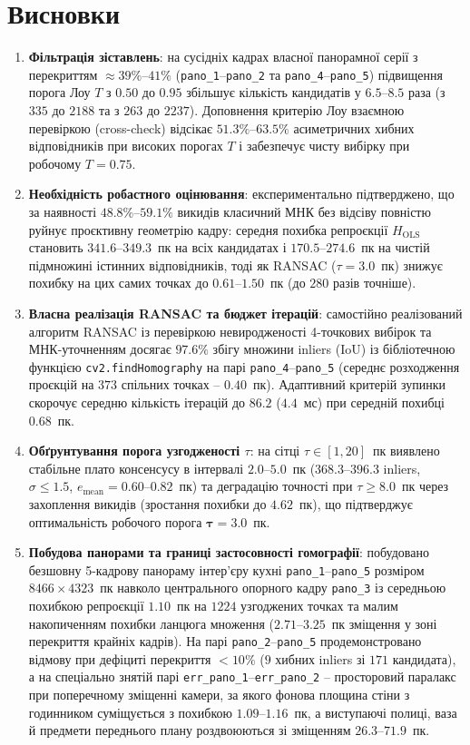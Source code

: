 \documentclass[14pt, a4paper]{extarticle}
\begin{document}
\section{Висновки}
\begin{enumerate}
    \item \textbf{Фільтрація зіставлень}: на сусідніх кадрах власної панорамної серії з перекриттям $\approx 39\%$--$41\%$ (\texttt{pano\_1}--\texttt{pano\_2} та \texttt{pano\_4}--\texttt{pano\_5}) підвищення порога Лоу $T$ з $0.50$ до $0.95$ збільшує кількість кандидатів у $6.5$--$8.5$ раза (з $335$ до $2188$ та з $263$ до $2237$). Доповнення критерію Лоу взаємною перевіркою (cross-check) відсікає $51.3\%$--$63.5\%$ асиметричних хибних відповідників при високих порогах $T$ і забезпечує чисту вибірку при робочому $T=0.75$.
    \item \textbf{Необхідність робастного оцінювання}: експериментально підтверджено, що за наявності $48.8\%$--$59.1\%$ викидів класичний МНК без відсіву повністю руйнує проєктивну геометрію кадру: середня похибка репроєкції $H_{\text{OLS}}$ становить $341.6$--$349.3$~пк на всіх кандидатах і $170.5$--$274.6$~пк на чистій підмножині істинних відповідників, тоді як RANSAC ($\tau=3.0$~пк) знижує похибку на цих самих точках до $\mathbf{0.61}$--$\mathbf{1.50}$~пк (до $280$ разів точніше).
    \item \textbf{Власна реалізація RANSAC та бюджет ітерацій}: самостійно реалізований алгоритм RANSAC із перевіркою невиродженості 4-точкових вибірок та МНК-уточненням досягає $\mathbf{97.6\%}$ збігу множини inliers (IoU) із бібліотечною функцією \texttt{cv2.findHomography} на парі \texttt{pano\_4}--\texttt{pano\_5} (середнє розходження проєкцій на $373$ спільних точках -- $0.40$~пк). Адаптивний критерій зупинки скорочує середню кількість ітерацій до $86.2$ ($4.4$~мс) при середній похибці $0.68$~пк.
    \item \textbf{Обґрунтування порога узгодженості $\tau$}: на сітці $\tau \in [1, 20]$~пк виявлено стабільне плато консенсусу в інтервалі $2.0$--$5.0$~пк ($368.3$--$396.3$ inliers, $\sigma \le 1.5$, $e_{\text{mean}} = 0.60$--$0.82$~пк) та деградацію точності при $\tau \ge 8.0$~пк через захоплення викидів (зростання похибки до $4.62$~пк), що підтверджує оптимальність робочого порога $\mathbf{\tau = 3.0}$~пк.
    \item \textbf{Побудова панорами та границі застосовності гомографії}: побудовано безшовну 5-кадрову панораму інтер'єру кухні \texttt{pano\_1}--\texttt{pano\_5} розміром $8466 \times 4323$~пк навколо центрального опорного кадру \texttt{pano\_3} із середньою похибкою репроєкції $\mathbf{1.10}$~пк на $1224$ узгоджених точках та малим накопиченням похибки ланцюга множення ($2.71$--$3.25$~пк зміщення у зоні перекриття крайніх кадрів). На парі \texttt{pano\_2}--\texttt{pano\_5} продемонстровано відмову при дефіциті перекриття $< 10\%$ ($9$ хибних inliers зі $171$ кандидата), а на спеціально знятій парі \texttt{err\_pano\_1}--\texttt{err\_pano\_2} -- просторовий паралакс при поперечному зміщенні камери, за якого фонова площина стіни з годинником суміщується з похибкою $1.09$--$1.16$~пк, а виступаючі полиці, ваза й предмети переднього плану роздвоюються зі зміщенням $26.3$--$71.9$~пк.
\end{enumerate}
\end{document}
